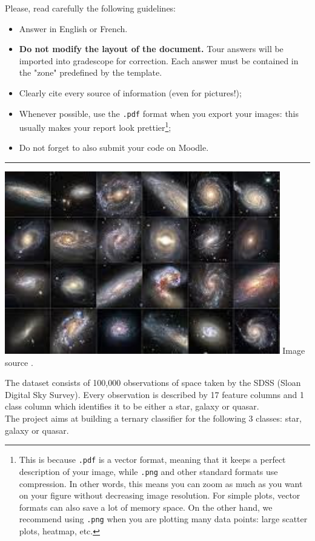 \documentclass [a4paper, 11pt] {article}
\begin{document}
    Please, read carefully the following guidelines:
    \vspace*{0.2cm}
    \begin{itemize}
        \item Answer in English or French.
        \item \textbf{Do not modify the layout of the document.} Tour answers will be imported into gradescope for correction. Each answer must be contained in the "zone" predefined by the template.
        \item Clearly cite every source of information (even for pictures!);
        \item Whenever possible, use the \texttt{.pdf} format when you export your images: this usually makes your report look prettier\footnote{This is because \texttt{.pdf} is a vector format, meaning that it keeps a perfect description of your image, while \texttt{.png} and other standard formats use compression. In other words, this means you can zoom as much as you want on your figure without decreasing image resolution. For simple plots, vector formats can also save a lot of memory space. On the other hand, we recommend using \texttt{.png} when you are plotting many data points: large scatter plots, heatmap, etc.};
        \item Do not forget to also submit your code on Moodle.
    \end{itemize}
    
    \vspace*{0.5cm}
    
      \hrule
   	
   	\vspace*{2.0cm}   
      
\begin{minipage}{0.5\textwidth}
\centering
	\includegraphics[width=0.9\textwidth]{imgs/stellar.jpeg}
	Image source \cite{StellarImg}.
\end{minipage}%
\begin{minipage}{0.45\textwidth}
The dataset \cite{carvalho_2022} consists of 100,000 observations of space taken by the SDSS (Sloan Digital Sky Survey). Every observation is described by 17 feature columns and 1 class column which identifies it to be either a star, galaxy or quasar.\\

The project aims at building a ternary classifier for the following 3 classes: star, galaxy or quasar. 
\end{minipage}
\end{document}
